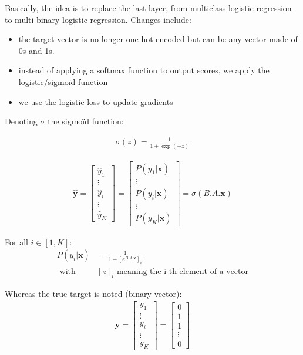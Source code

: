 Basically, the idea is to replace the last layer, from multiclass logistic regression to multi-binary logistic regression. Changes include:

\begin{itemize}
	\item the target vector is no longer one-hot encoded but can be any vector made of 0s and 1s.
	\item instead of applying a softmax function to output scores, we apply the logistic/sigmoïd function
	\item we use the logistic loss to update gradients
\end{itemize}


Denoting $\sigma$ the sigmoïd function:

\begin{align}
	\sigma(z) = \frac{1}{1 + \exp(-z)}
\end{align}

\begin{align}
 \mathbf{\hat y}
 	= \begin{bmatrix} 
		\hat y_1 \\
		\vdots \\
		\hat y_i\\
		\vdots \\
		\hat y_K
	\end{bmatrix}
	 = \begin{bmatrix} 
		P(y_1 | \mathbf{x}) \\
		\vdots \\
		P(y_i | \mathbf{x})\\
		\vdots \\
		P(y_K | \mathbf{x})
	\end{bmatrix} = 
	\sigma(B.A.\mathbf{x})
\end{align}

For all $i \in [1, K]$: 
\begin{align}
	P(y_i | \mathbf{x}) &= \frac{1}{1 + [e^{B.A.\mathbf{x}}]_i}\\
		\text{      with } &[z]_i \text{ meaning the i-th element of a vector}
\end{align}

Whereas the true target is noted (binary vector):
\begin{align}
 \mathbf{y} = 
	\begin{bmatrix} 
		y_1 \\
		\vdots \\
		y_i \\
		\vdots \\
		y_K
	\end{bmatrix}
	= 
	\begin{bmatrix} 
		0 \\
		1 \\
		1 \\
		\vdots \\
		0
	\end{bmatrix}  
\end{align}

